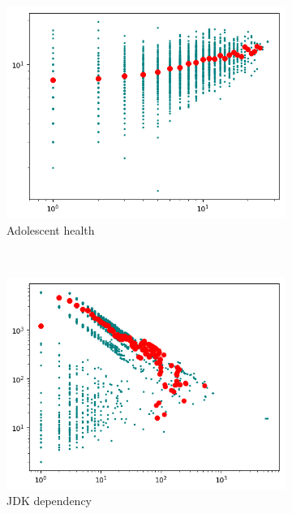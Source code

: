 \begin{figure}[h]
    \centering
    \begin{subfigure}[b]{0.3\textwidth}
        \includegraphics[width=\textwidth]{img/scatter_0}
        \caption*{Adolescent health}
    \end{subfigure}
    ~
    \begin{subfigure}[b]{0.3\textwidth}
        \includegraphics[width=\textwidth]{img/scatter_1}
        \caption*{JDK dependency}
    \end{subfigure}
    ~
    \begin{subfigure}[b]{0.3\textwidth}

\end{subfigure}
\end{figure}
